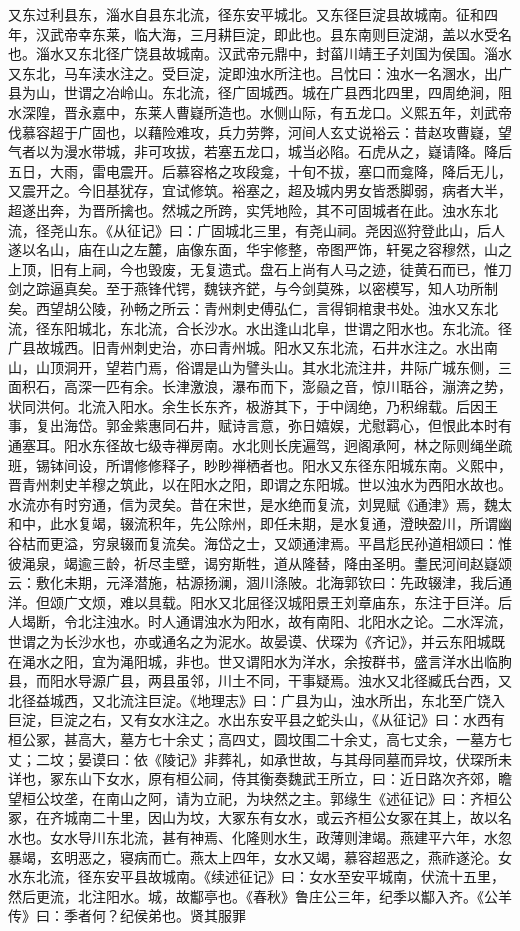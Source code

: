 \documentclass[12pt,UTF8]{ctexbook}
\begin{document}
又东过利县东，淄水自县东北流，径东安平城北。又东径巨淀县故城南。征和四年，汉武帝幸东莱，临大海，三月耕巨淀，即此也。县东南则巨淀湖，盖以水受名也。淄水又东北径广饶县故城南。汉武帝元鼎中，封菑川靖王子刘国为侯国。淄水又东北，马车渎水注之。受巨淀，淀即浊水所注也。吕忱曰：浊水一名溷水，出广县为山，世谓之冶岭山。东北流，径广固城西。城在广县西北四里，四周绝涧，阻水深隍，晋永嘉中，东莱人曹嶷所造也。水侧山际，有五龙口。义熙五年，刘武帝伐慕容超于广固也，以藉险难攻，兵力劳弊，河间人玄丈说裕云：昔赵攻曹嶷，望气者以为漫水带城，非可攻拔，若塞五龙口，城当必陷。石虎从之，嶷请降。降后五日，大雨，雷电震开。后慕容格之攻段龛，十旬不拔，塞口而龛降，降后无儿，又震开之。今旧基犹存，宜试修筑。裕塞之，超及城内男女皆悉脚弱，病者大半，超遂出奔，为晋所擒也。然城之所跨，实凭地险，其不可固城者在此。浊水东北流，径尧山东。《从征记》曰：广固城北三里，有尧山祠。尧因巡狩登此山，后人遂以名山，庙在山之左麓，庙像东面，华宇修整，帝图严饰，轩冕之容穆然，山之上顶，旧有上祠，今也毁废，无复遗式。盘石上尚有人马之迹，徒黄石而已，惟刀剑之踪逼真矣。至于燕锋代锷，魏铗齐鋩，与今剑莫殊，以密模写，知人功所制矣。西望胡公陵，孙畅之所云：青州刺史傅弘仁，言得铜棺隶书处。浊水又东北流，径东阳城北，东北流，合长沙水。水出逢山北阜，世谓之阳水也。东北流。径广县故城西。旧青州刺史治，亦曰青州城。阳水又东北流，石井水注之。水出南山，山顶洞开，望若门焉，俗谓是山为譬头山。其水北流注井，井际广城东侧，三面积石，高深一匹有余。长津激浪，瀑布而下，澎赑之音，惊川聒谷，漰渀之势，状同洪何。北流入阳水。余生长东齐，极游其下，于中阔绝，乃积绵载。后因王事，复出海岱。郭金紫惠同石井，赋诗言意，弥日嬉娱，尤慰羁心，但恨此本时有通塞耳。阳水东径故七级寺禅房南。水北则长庑遍驾，迥阁承阿，林之际则绳坐疏班，锡钵间设，所谓修修释子，眇眇禅栖者也。阳水又东径东阳城东南。义熙中，晋青州刺史羊穆之筑此，以在阳水之阳，即谓之东阳城。世以浊水为西阳水故也。水流亦有时穷通，信为灵矣。昔在宋世，是水绝而复流，刘晃赋《通津》焉，魏太和中，此水复竭，辍流积年，先公除州，即任未期，是水复通，澄映盈川，所谓幽谷枯而更溢，穷泉辍而复流矣。海岱之士，又颂通津焉。平昌尨民孙道相颂曰：惟彼渑泉，竭逾三龄，祈尽圭壁，谒穷斯牲，道从隆替，降由圣明。耋民河间赵嶷颂云：敷化未期，元泽潜施，枯源扬澜，涸川涤陂。北海郭钦曰：先政辍津，我后通洋。但颂广文烦，难以具载。阳水又北屈径汉城阳景王刘章庙东，东注于巨洋。后人堨断，令北注浊水。时人通谓浊水为阳水，故有南阳、北阳水之论。二水浑流，世谓之为长沙水也，亦或通名之为泥水。故晏谟、伏琛为《齐记》，并云东阳城既在渑水之阳，宜为渑阳城，非也。世又谓阳水为洋水，余按群书，盛言洋水出临朐县，而阳水导源广县，两县虽邻，川土不同，干事疑焉。浊水又北径臧氏台西，又北径益城西，又北流注巨淀。《地理志》曰：广县为山，浊水所出，东北至广饶入巨淀，巨淀之右，又有女水注之。水出东安平县之蛇头山，《从征记》曰：水西有桓公冢，甚高大，墓方七十余丈；高四丈，圆坟围二十余丈，高七丈余，一墓方七丈；二坟；晏谟曰：依《陵记》非葬礼，如承世故，与其母同墓而异坟，伏琛所未详也，冢东山下女水，原有桓公祠，侍其衡奏魏武王所立，曰：近日路次齐郊，瞻望桓公坟垄，在南山之阿，请为立祀，为块然之主。郭缘生《述征记》曰：齐桓公冢，在齐城南二十里，因山为坟，大冢东有女水，或云齐桓公女冢在其上，故以名水也。女水导川东北流，甚有神焉、化隆则水生，政薄则津竭。燕建平六年，水忽暴竭，玄明恶之，寝病而亡。燕太上四年，女水又竭，慕容超恶之，燕祚遂沦。女水东北流，径东安平县故城南。《续述征记》曰：女水至安平城南，伏流十五里，然后更流，北注阳水。城，故酅亭也。《春秋》鲁庄公三年，纪季以酅入齐。《公羊传》曰：季者何？纪侯弟也。贤其服罪
\end{document}
